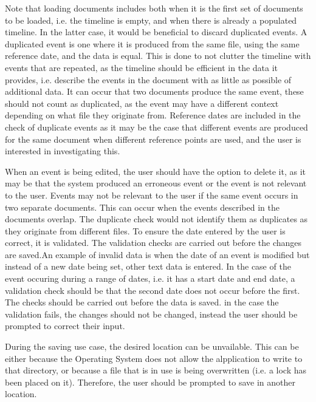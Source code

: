 \par Note that loading documents includes both when it is the first set of documents to be loaded, i.e. the timeline is empty, and when there is already a populated timeline. In the latter case, it would be beneficial to discard duplicated events. A duplicated event is one where it is produced from the same file, using the same reference date, and the data is equal. This is done to not clutter the timeline with events that are repeated, as the timeline should be efficient in the data it provides, i.e. describe the events in the document with as little as possible of additional data. It can occur that two documents produce the same event, these should not count as duplicated, as the event may have a different context depending on what file they originate from. Reference dates are included in the check of duplicate events as it may be the case that different events are produced for the same document when different reference points are used, and the user is interested in investigating this. 

\par When an event is being edited, the user should have the option to delete it, as it may be that the system produced an erroneous event or the event is not relevant to the user. Events may not be relevant to the user if the same event occurs in two separate documents. This can occur when the events described in the documents overlap. The duplicate check would not identify them as duplicates as they originate from different files. To ensure the date entered by the user is correct, it is validated. The validation checks are carried out before the changes are saved.An example of invalid data is when the date of an event is modified but instead of a new date being set, other text data is entered. In the case of the event occuring during a range of dates, i.e. it has a start date and end date, a validation check should be that the second date does not occur before the first. The checks should be carried out before the data is saved. in the case the validation fails, the changes should not be changed, instead the user should be prompted to correct their input.
\par During the saving use case, the desired location can be unvailable. This can be either because the Operating System does not allow the alpplication to write to that directory, or because a file that is in use is being overwritten (i.e. a lock has been placed on it). Therefore, the user should be prompted to save in another location.

